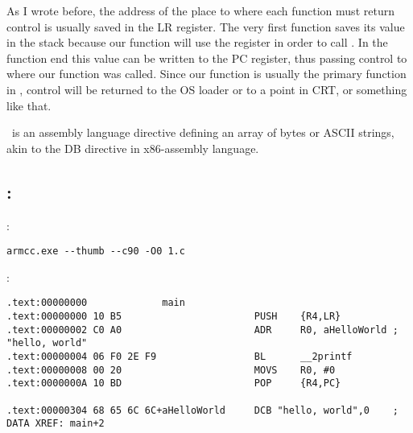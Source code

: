 {As I wrote before, the address of the place to where each function must return control is usually saved in the \ac{LR}
register}.
{The very first function saves its value in the stack because our
\main function will use the register in order to call \printf}.
{In the function end this value can be written to the \ac{PC} register, thus passing control to where our function was called}.
{Since our \main function is usually the primary function in \CCpp,
control will be returned to the \ac{OS} loader or to a point in \ac{CRT},
or something like that}.

{~is an assembly language directive defining an array of bytes or ASCII strings, akin to the DB directive 
in x86-assembly language}.

\subsection{\NonOptimizingKeil: \ThumbMode}

:

\begin{lstlisting}
armcc.exe --thumb --c90 -O0 1.c 
\end{lstlisting}

:

\begin{lstlisting}[caption=\NonOptimizingKeil + \ThumbMode + \IDA]
.text:00000000             main
.text:00000000 10 B5                       PUSH    {R4,LR}
.text:00000002 C0 A0                       ADR     R0, aHelloWorld ; "hello, world"
.text:00000004 06 F0 2E F9                 BL      __2printf
.text:00000008 00 20                       MOVS    R0, #0
.text:0000000A 10 BD                       POP     {R4,PC}

.text:00000304 68 65 6C 6C+aHelloWorld     DCB "hello, world",0    ; DATA XREF: main+2
\end{lstlisting}

